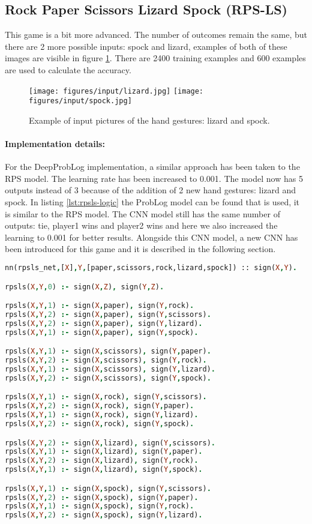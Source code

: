 \subsection{Rock Paper Scissors Lizard Spock (RPS-LS)}
This game is a bit more advanced. The number of outcomes remain the same, but there are 2 more possible inputs: spock and lizard, examples of both of these images are visible in figure \ref{fig:rpsls_input}. There are 2400 training examples and 600 examples are used to calculate the accuracy. 
\begin{figure}
    \centering
    \texttt{[image: figures/input/lizard.jpg]}
    \texttt{[image: figures/input/spock.jpg]}
    \caption{Example of input pictures of the hand gestures: lizard and spock\cite{RPSLS-database}.} %
    \label{fig:rpsls_input}
\end{figure}


\paragraph{Implementation details:} For the DeepProbLog implementation, a similar approach has been taken to the RPS model. The learning rate has been increased to 0.001. The model now has 5 outputs instead of 3 because of the addition of 2 new hand gestures: lizard and spock. In listing \ref{lst:rpsls-logic} the ProbLog model can be found that is used, it is similar to the RPS model. The CNN model still has the same number of outputs: tie, player1 wins and player2 wins and here we also increased the learning to 0.001 for better results. Alongside this CNN model, a new CNN has been introduced for this game and it is described in the following section. 

\begin{lstlisting}[label={lst:rpsls-logic},language=Prolog,frame=single,caption={Rock paper scissors lizard spock DeepProbLog model},captionpos=b]
nn(rpsls_net,[X],Y,[paper,scissors,rock,lizard,spock]) :: sign(X,Y).

rpsls(X,Y,0) :- sign(X,Z), sign(Y,Z).

rpsls(X,Y,1) :- sign(X,paper), sign(Y,rock).
rpsls(X,Y,2) :- sign(X,paper), sign(Y,scissors).
rpsls(X,Y,2) :- sign(X,paper), sign(Y,lizard).
rpsls(X,Y,1) :- sign(X,paper), sign(Y,spock).

rpsls(X,Y,1) :- sign(X,scissors), sign(Y,paper).
rpsls(X,Y,2) :- sign(X,scissors), sign(Y,rock).
rpsls(X,Y,1) :- sign(X,scissors), sign(Y,lizard).
rpsls(X,Y,2) :- sign(X,scissors), sign(Y,spock).

rpsls(X,Y,1) :- sign(X,rock), sign(Y,scissors).
rpsls(X,Y,2) :- sign(X,rock), sign(Y,paper).
rpsls(X,Y,1) :- sign(X,rock), sign(Y,lizard).
rpsls(X,Y,2) :- sign(X,rock), sign(Y,spock).

rpsls(X,Y,2) :- sign(X,lizard), sign(Y,scissors).
rpsls(X,Y,1) :- sign(X,lizard), sign(Y,paper).
rpsls(X,Y,2) :- sign(X,lizard), sign(Y,rock).
rpsls(X,Y,1) :- sign(X,lizard), sign(Y,spock).

rpsls(X,Y,1) :- sign(X,spock), sign(Y,scissors).
rpsls(X,Y,2) :- sign(X,spock), sign(Y,paper).
rpsls(X,Y,1) :- sign(X,spock), sign(Y,rock).
rpsls(X,Y,2) :- sign(X,spock), sign(Y,lizard).
\end{lstlisting}

